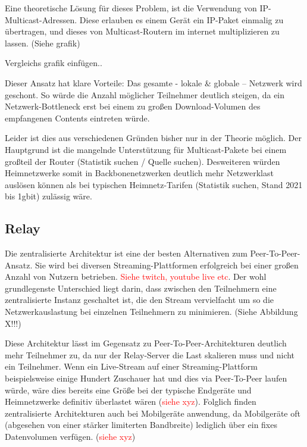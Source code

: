 \documentclass{article}
\begin{document}
\begin{onecolumn}
Eine theoretische Lösung für dieses Problem, ist die Verwendung von
IP-Multicast-Adressen. Diese erlauben es einem Gerät ein IP-Paket einmalig zu
übertragen, und dieses von Multicast-Routern im internet multiplizieren zu
lassen. (Siehe grafik)

Vergleichs grafik einfügen..

Dieser Ansatz hat klare Vorteile: Das gesamte - lokale \& globale – Netzwerk
wird geschont. So würde die Anzahl möglicher Teilnehmer deutlich steigen, da
ein Netzwerk-Bottleneck erst bei einem zu großen Download-Volumen des
empfangenen Contents eintreten würde.

Leider ist dies aus verschiedenen Gründen bisher nur in der Theorie möglich.
Der Hauptgrund ist die mangelnde Unterstützung für Multicast-Pakete bei einem
großteil der Router (Statistik suchen / Quelle suchen). Desweiteren würden
Heimnetzwerke somit in Backbonenetzwerken deutlich mehr Netzwerklast auslösen
können als bei typischen Heimnetz-Tarifen (Statistik suchen, Stand 2021 bis
1gbit) zulässig wäre.

\subsection{Relay}

Die zentralisierte Architektur ist eine der besten Alternativen zum
Peer-To-Peer-Ansatz. Sie wird bei diversen Streaming-Plattformen erfolgreich
bei einer großen Anzahl von Nutzern betrieben. \textcolor{red}{Siehe twitch,
youtube live etc}. Der wohl grundlegenste Unterschied liegt darin, dass
zwischen den Teilnehmern eine zentralisierte Instanz geschaltet ist, die den
Stream vervielfacht um so die Netzwerkauslastung bei einzelnen Teilnehmern zu
minimieren. (Siehe Abbildung X!!!)


Diese Architektur lässt im Gegensatz zu Peer-To-Peer-Architekturen deutlich
mehr Teilnehmer zu, da nur der Relay-Server die Last skalieren muss und nicht
ein Teilnehmer. Wenn ein Live-Stream auf einer Streaming-Plattform
beispielsweise einige Hundert Zuschauer hat und dies via Peer-To-Peer laufen
würde, wäre dies bereits eine Größe bei der typische Endgeräte und
Heimnetzwerke definitiv überlastet wären (\textcolor{red}{siehe xyz}). Folglich
finden zentralisierte Architekturen auch bei Mobilgeräte anwendung, da
Mobilgeräte oft (abgesehen von einer stärker limiterten Bandbreite) lediglich
über ein fixes Datenvolumen verfügen. (\textcolor{red}{siehe xyz})


\end{onecolumn}
\end{document}
